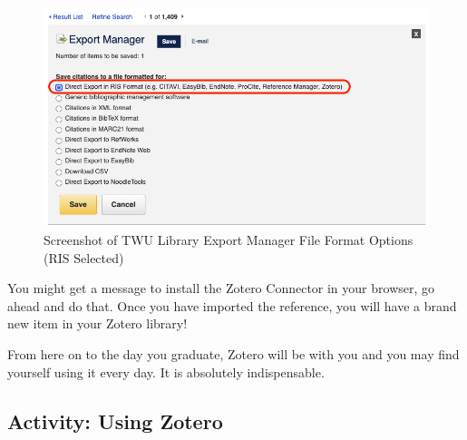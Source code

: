 \documentclass[
  letterpaper,
  DIV=11,
  numbers=noendperiod]{scrreprt}
\begin{document}
\begin{figure}

\caption{\label{fig-library3}Screenshot of TWU Library Export Manager
File Format Options (RIS Selected)}

\includegraphics{assets/u2/library3.png}

\end{figure}%

You might get a message to install the Zotero Connector in your browser,
go ahead and do that. Once you have imported the reference, you will
have a brand new item in your Zotero library!

From here on to the day you graduate, Zotero will be with you and you
may find yourself using it every day. It is absolutely indispensable.

\subsection{Activity: Using Zotero}\label{activity-using-zotero}
\end{document}
